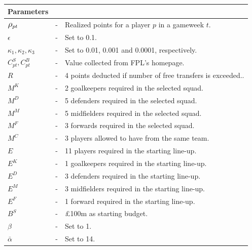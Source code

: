 \begin{table}[H] 
\tabcolsep=0.11cm
\centering
\begin{tabular}{@{}lll@{}}
\toprule
Parameters                       &   &                                                                                                \\ \midrule
$\mathlarger{\rho_{pt}}$ & - & Realized points for a player $p$ in a gameweek $t$. \\
$\epsilon$                       & - & Set to 0.1.                                                                     \\
$\kappa_{1}, \kappa_{2}, \kappa_{3} $                     & - & Set to 0.01, 0.001 and 0.0001, respectively.                                               \\
$C_{pt}^{S}, C_{pt}^{B}$         & - & Value collected from FPL's homepage.  \\ 
$R$                              & - &  4 points deducted if number of free transfers is exceeded..       \\
$M^{K}$                          & - &  2 goalkeepers required in the selected squad.                                      \\
$M^{D}$                          & - &  5 defenders required in the selected squad.                         \\
$M^{M}$                          & - & 5 midfielders required in the selected squad.                                     \\
$M^{F}$                          & - & 3 forwards required in the selected squad.                                    \\
$M^{C}$                          & - & 3 players allowed to have from the same team.                                \\
$E$                              & - & 11 players required in the starting line-up.                              \\
$E^{K}$                          & - & 1 goalkeepers required in the starting line-up.                                       \\
$E^{D}$                          & - & 3 defenders required in the starting line-up.                  \\
$E^{M}$                          & - & 3 midfielders required in the starting line-up.                                 \\
$E^{F}$                          & - & 1 forward required in the starting line-up.                     \\
$B^{S}$                          & - & \pounds 100m as starting budget.                                                                              \\
$\beta$                          & - & Set to 1.                                                                                  \\          
$\bar{\alpha}$                   & - & Set to 14.                                                                      \\


\end{tabular}
\end{table}
